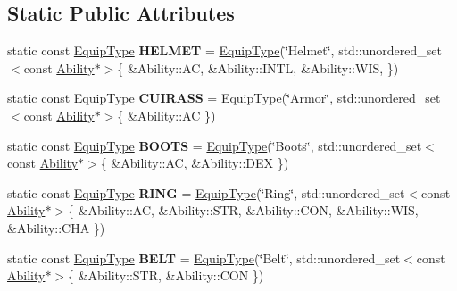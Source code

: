 \subsection*{Static Public Attributes}
\begin{DoxyCompactItemize}
\item 
\hypertarget{class_equip_type_a0ad3a2f66447465ec7bcf023517aad4d}{}\label{class_equip_type_a0ad3a2f66447465ec7bcf023517aad4d} 
static const \hyperlink{class_equip_type}{Equip\+Type} {\bfseries H\+E\+L\+M\+ET} = \hyperlink{class_equip_type}{Equip\+Type}(\char`\"{}Helmet\char`\"{}, std\+::unordered\+\_\+set$<$const \hyperlink{class_ability}{Ability}$\ast$$>$\{ \&Ability\+::\+AC, \&Ability\+::\+I\+N\+TL, \&Ability\+::\+W\+IS, \})
\item 
\hypertarget{class_equip_type_a75eb1f613017700885b5ba17b869288f}{}\label{class_equip_type_a75eb1f613017700885b5ba17b869288f} 
static const \hyperlink{class_equip_type}{Equip\+Type} {\bfseries C\+U\+I\+R\+A\+SS} = \hyperlink{class_equip_type}{Equip\+Type}(\char`\"{}Armor\char`\"{}, std\+::unordered\+\_\+set$<$const \hyperlink{class_ability}{Ability}$\ast$$>$\{ \&Ability\+::\+AC \})
\item 
\hypertarget{class_equip_type_ad4fcb251950aa992744f8fa8501a830f}{}\label{class_equip_type_ad4fcb251950aa992744f8fa8501a830f} 
static const \hyperlink{class_equip_type}{Equip\+Type} {\bfseries B\+O\+O\+TS} = \hyperlink{class_equip_type}{Equip\+Type}(\char`\"{}Boots\char`\"{}, std\+::unordered\+\_\+set$<$const \hyperlink{class_ability}{Ability}$\ast$$>$\{ \&Ability\+::\+AC, \&Ability\+::\+D\+EX \})
\item 
\hypertarget{class_equip_type_ac6d91237e6bf68bceda1b19e57022b42}{}\label{class_equip_type_ac6d91237e6bf68bceda1b19e57022b42} 
static const \hyperlink{class_equip_type}{Equip\+Type} {\bfseries R\+I\+NG} = \hyperlink{class_equip_type}{Equip\+Type}(\char`\"{}Ring\char`\"{}, std\+::unordered\+\_\+set$<$const \hyperlink{class_ability}{Ability}$\ast$$>$\{ \&Ability\+::\+AC, \&Ability\+::\+S\+TR, \&Ability\+::\+C\+ON, \&Ability\+::\+W\+IS, \&Ability\+::\+C\+HA \})
\item 
\hypertarget{class_equip_type_a09cc664449dd4ade565f79e45c835f95}{}\label{class_equip_type_a09cc664449dd4ade565f79e45c835f95} 
static const \hyperlink{class_equip_type}{Equip\+Type} {\bfseries B\+E\+LT} = \hyperlink{class_equip_type}{Equip\+Type}(\char`\"{}Belt\char`\"{}, std\+::unordered\+\_\+set$<$const \hyperlink{class_ability}{Ability}$\ast$$>$\{ \&Ability\+::\+S\+TR, \&Ability\+::\+C\+ON \})
\item 
$$
\end{DoxyCompactItemize}
